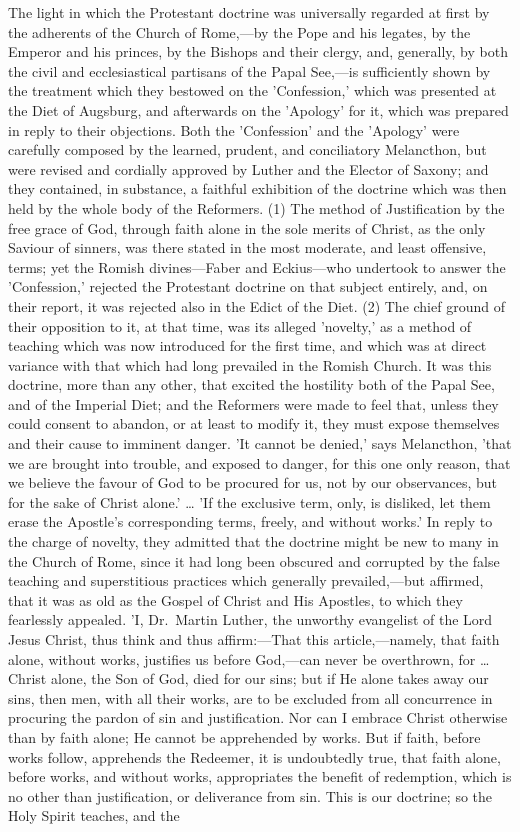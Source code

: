 \documentclass[
]{book}
\begin{document}
The light in which the Protestant doctrine was universally regarded at first by the adherents of the Church of Rome,---by the Pope and his legates, by the Emperor and his princes, by the Bishops and their clergy, and, generally, by both the civil and ecclesiastical partisans of the Papal See,---is sufficiently shown by the treatment which they bestowed on the 'Confession,' which was presented at the Diet of Augsburg, and afterwards on the 'Apology' for it, which was prepared in reply to their objections. Both the 'Confession' and the 'Apology' were carefully composed by the learned, prudent, and conciliatory Melancthon, but were revised and cordially approved by Luther and the Elector of Saxony; and they contained, in substance, a faithful exhibition of the doctrine which was then held by the whole body of the Reformers. (1) The method of Justification by the free grace of God, through faith alone in the sole merits of Christ, as the only Saviour of sinners, was there stated in the most moderate, and least offensive, terms; yet the Romish divines---Faber and Eckius---who undertook to answer the 'Confession,' rejected the Protestant doctrine on that subject entirely, and, on their report, it was rejected also in the Edict of the Diet. (2) The chief ground of their opposition to it, at that time, was its alleged 'novelty,' as a method of teaching which was now introduced for the first time, and which was at direct variance with that which had long prevailed in the Romish Church. It was this doctrine, more than any other, that excited the hostility both of the Papal See, and of the Imperial Diet; and the Reformers were made to feel that, unless they could consent to abandon, or at least to modify it, they must expose themselves and their cause to imminent danger. 'It cannot be denied,' says Melancthon, 'that we are brought into trouble, and exposed to danger, for this one only reason, that we believe the favour of God to be procured for us, not by our observances, but for the sake of Christ alone.' \ldots{} 'If the exclusive term, only, is disliked, let them erase the Apostle's corresponding terms, freely, and without works.' In reply to the charge of novelty, they admitted that the doctrine might be new to many in the Church of Rome, since it had long been obscured and corrupted by the false teaching and superstitious practices which generally prevailed,---but affirmed, that it was as old as the Gospel of Christ and His Apostles, to which they fearlessly appealed. 'I, Dr.~Martin Luther, the unworthy evangelist of the Lord Jesus Christ, thus think and thus affirm:---That this article,---namely, that faith alone, without works, justifies us before God,---can never be overthrown, for \ldots{} Christ alone, the Son of God, died for our sins; but if He alone takes away our sins, then men, with all their works, are to be excluded from all concurrence in procuring the pardon of sin and justification. Nor can I embrace Christ otherwise than by faith alone; He cannot be apprehended by works. But if faith, before works follow, apprehends the Redeemer, it is undoubtedly true, that faith alone, before works, and without works, appropriates the benefit of redemption, which is no other than justification, or deliverance from sin. This is our doctrine; so the Holy Spirit teaches, and the 
\end{document}
